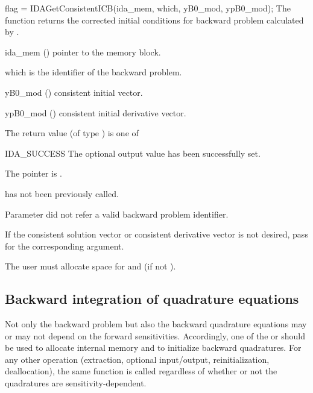 {
  flag = IDAGetConsistentICB(ida\_mem, which, yB0\_mod, ypB0\_mod);
}
{
  The function  returns the corrected initial conditions
  for backward problem calculated by .
}
{
  \begin{args}
  \item[ida\_mem] ()
    pointer to the {\idas} memory block.
  \item[which]
    is the identifier of the backward problem.
  \item[yB0\_mod] ()
    consistent initial vector.
  \item[ypB0\_mod] ()
    consistent initial derivative vector.
  \end{args}
}
{
  The return value  (of type ) is one of
  \begin{args}
  \item[IDA\_SUCCESS]
    The optional output value has been successfully set.
  \item[\Id{IDA\_MEM\_NULL}]
    The  pointer is .
  \item[\Id{IDA\_NO\_ADJ}]
     has not been previously called.
  \item[\Id{IDA\_ILL\_INPUT}]
    Parameter  did not refer a valid backward problem identifier.
  \end{args}
}
{
  If the consistent solution vector or consistent derivative vector
  is not desired, pass  for the corresponding argument.

  {\warn} The user must allocate space for  and 
  (if not ).
}

\subsection{Backward integration of quadrature equations}

Not only the backward problem but also the backward quadrature equations
may or may not depend on the forward sensitivities. Accordingly, one of the
 or  should be used to allocate internal
memory and to initialize backward quadratures.  For any other operation
(extraction, optional input/output, reinitialization, deallocation), the
same function is called regardless of whether or not the quadratures are
sensitivity-dependent.

